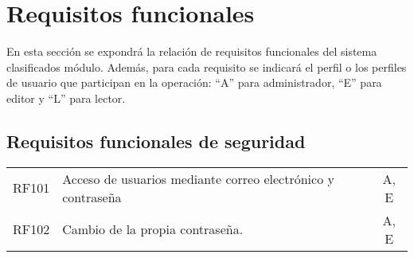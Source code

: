 \section{Requisitos funcionales}
En esta sección se expondrá la relación de requisitos funcionales del sistema clasificados módulo. Además, para cada requisito se indicará el perfil o los perfiles de usuario que participan en la operación: ``A'' para administrador, ``E'' para editor y ``L'' para lector.

\subsection{Requisitos funcionales de seguridad}
\begin{table}[hbt!]
  \centering
  \setlength\extrarowheight{14pt}
  \begin{tabularx}{\textwidth}{cXc}
    RF101\label{RF101} & Acceso de usuarios mediante correo electrónico y contraseña & A, E \\
    RF102\label{RF102} & Cambio de la propia contraseña. & A, E \\
  \end{tabularx}
  \label{cuadro:requistios-de-seguridad }
\end{table}
\FloatBarrier

